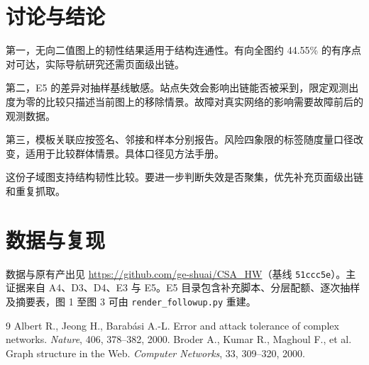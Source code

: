 \documentclass[11pt,a4paper]{ctexart}
\begin{document}
\section{讨论与结论}

第一，无向二值图上的韧性结果适用于结构连通性。有向全图约 44.55\% 的有序点对可达，实际导航研究还需页面级出链。

第二，E5 的差异对抽样基线敏感。站点失效会影响出链能否被采到，限定观测出度为零的比较只描述当前图上的移除情景。故障对真实网络的影响需要故障前后的观测数据。

第三，模板关联应按签名、邻接和样本分别报告。风险四象限的标签随度量口径改变，适用于比较群体情景。具体口径见方法手册。

这份子域图支持结构韧性比较。要进一步判断失效是否聚集，优先补充页面级出链和重复抓取。

\section*{数据与复现}

数据与原有产出见 \url{https://github.com/ge-shuai/CSA_HW}（基线 \texttt{51ccc5e}）。主证据来自 A4、D3、D4、E3 与 E5。E5 目录包含补充脚本、分层配额、逐次抽样及摘要表，图 1 至图 3 可由 \texttt{render\_followup.py} 重建。

\enlargethispage{\baselineskip}
\begin{thebibliography}{9}
 Albert R., Jeong H., Barabási A.-L. Error and attack tolerance of complex networks. \emph{Nature}, 406, 378--382, 2000.
 Broder A., Kumar R., Maghoul F., et al. Graph structure in the Web. \emph{Computer Networks}, 33, 309--320, 2000.
\end{thebibliography}
\end{document}
